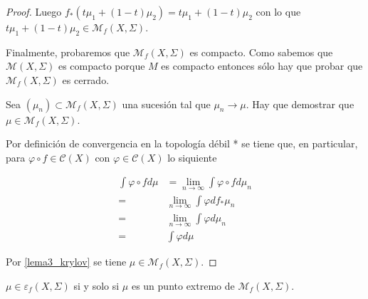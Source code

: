 \begin{proof}
	Luego $f_*(t\mu_1 + (1-t)\mu_2) = t\mu_1 + (1-t)\mu_2$ con lo que $t\mu_1 + (1-t)\mu_2 \in \mathcal{M}_f(X,\Sigma)$.
	
	Finalmente, probaremos que $\mathcal{M}_f(X,\Sigma)$ es compacto. Como sabemos que $\mathcal{M}(X,\Sigma)$ es compacto porque $M$ es compacto entonces sólo hay que probar que $\mathcal{M}_f(X,\Sigma)$ es cerrado.
	
	Sea $(\mu_n) \subset \mathcal{M}_f(X,\Sigma)$ una sucesión tal que $\mu_n \rightarrow \mu$. Hay que demostrar que $\mu \in \mathcal{M}_f(X,\Sigma)$.
	
	Por definición de convergencia en la topología débil * se tiene que, en particular, para $\varphi \circ f \in \mathcal{C}(X)$ con $\varphi \in \mathcal{C}(X)$ lo siquiente
	
	\begin{align}
	\int \varphi \circ f d\mu &= \lim_{n \rightarrow \infty} \int \varphi \circ f d\mu_n\\
	=& \lim_{n \rightarrow \infty} \int \varphi df_*\mu_n\\
	=& \lim_{n \rightarrow \infty} \int \varphi d\mu_n\\
	=& \int \varphi d\mu
	\end{align}
	
	Por \ref{lema3_krylov} se tiene $\mu \in \mathcal{M}_f(X,\Sigma)$.
\end{proof}

\begin{teorema}
	$\mu \in \varepsilon_f(X,\Sigma)$ si y solo si $\mu$ es un punto extremo de $\mathcal{M}_f(X,\Sigma)$.
\end{teorema}

